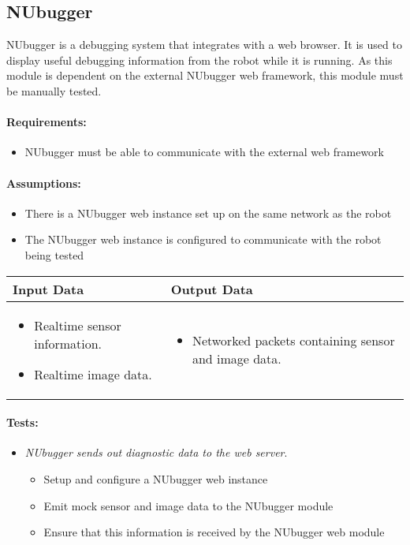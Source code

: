 \documentclass[english,12pt]{scrartcl}
\newcounter{testcounter}
\newcommand{\test}[1] {
	\stepcounter{testcounter}
	\item[] \emph{#1}.}
\begin{document}
	\subsection{NUbugger}
		NUbugger is a debugging system that integrates with a web browser.
		It is used to display useful debugging information from the robot while it is running.
		As this module is dependent on the external NUbugger web framework, this module must be manually tested.

		\paragraph{Requirements:}
		\begin{itemize}
			\item NUbugger must be able to communicate with the external web framework
		\end{itemize}

		\paragraph{Assumptions:}
		\begin{itemize}
			\item There is a NUbugger web instance set up on the same network as the robot
			\item The NUbugger web instance is configured to communicate with the robot being tested
		\end{itemize}

		\begin{tabular}{p{7cm}|p{7cm}}
    			\textbf{Input Data} & \textbf{Output Data} \\ \hline
			\begin{itemize}
				\item Realtime sensor information.
				\item Realtime image data.
			\end{itemize}
			&
			\begin{itemize}
				\item Networked packets containing sensor and image data.
			\end{itemize}
		\end{tabular}

		\paragraph{Tests:}
		\begin{itemize}
			\test{NUbugger sends out diagnostic data to the web server}
			\begin{itemize}
				\item Setup and configure a NUbugger web instance
				\item Emit mock sensor and image data to the NUbugger module
				\item Ensure that this information is received by the NUbugger web module
			\end{itemize}
		\end{itemize}
\end{document}
